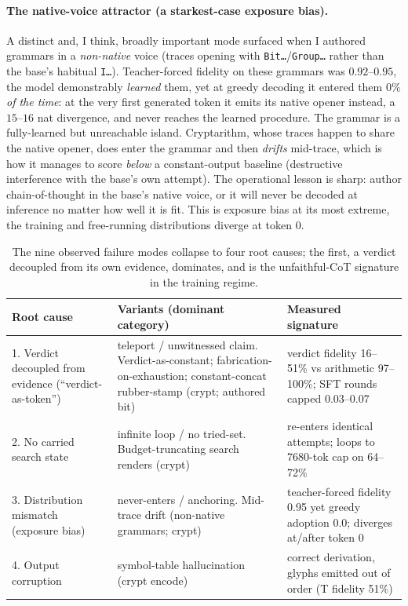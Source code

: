 \documentclass[11pt]{article}
\begin{document}
\paragraph{The native-voice attractor (a starkest-case exposure bias).} A distinct and, I
think, broadly important mode surfaced when I authored grammars in a \emph{non-native}
voice (traces opening with \texttt{Bit\dots}/\texttt{Group\dots} rather than the base's
habitual \texttt{I\dots}). Teacher-forced fidelity on these grammars was
$0.92$--$0.95$, the model demonstrably \emph{learned} them, yet at greedy decoding it
entered them \emph{$0\%$ of the time}: at the very first generated token it emits its native
opener instead, a $15$--$16$ nat divergence, and never reaches the learned procedure. The
grammar is a fully-learned but unreachable island. Cryptarithm, whose traces happen to share
the native opener, does enter the grammar and then \emph{drifts} mid-trace, which is how it
manages to score \emph{below} a constant-output baseline (destructive interference with the
base's own attempt). The operational lesson is sharp: author chain-of-thought in the base's
native voice, or it will never be decoded at inference no matter how well it is fit. This is
exposure bias \citep{bengio2015scheduled, ranzato2016sequence} at its most extreme, the
training and free-running distributions diverge at token $0$.

\begin{table}[htbp]
\centering
\caption{The nine observed failure modes collapse to four root causes; the first, a verdict
decoupled from its own evidence, dominates, and is the unfaithful-CoT signature
\citep{turpin2023unfaithful, lanham2023measuring} in the training regime.}
\label{tab:failuremodes}
\small
\begin{tabularx}{\linewidth}{@{}p{2.9cm} X X@{}}
\toprule
Root cause & Variants (dominant category) & Measured signature \\
\midrule
1. Verdict decoupled from evidence (``verdict-as-token'') & teleport / unwitnessed claim. Verdict-as-constant; fabrication-on-exhaustion; constant-concat rubber-stamp (crypt; authored bit) & verdict fidelity 16--51\% vs arithmetic 97--100\%; SFT rounds capped 0.03--0.07 \\
2. No carried search state & infinite loop / no tried-set. Budget-truncating search renders (crypt) & re-enters identical attempts; loops to 7680-tok cap on 64--72\% \\
3. Distribution mismatch (exposure bias) & never-enters / anchoring. Mid-trace drift (non-native grammars; crypt) & teacher-forced fidelity 0.95 yet greedy adoption 0.0; diverges at/after token 0 \\
4. Output corruption & symbol-table hallucination (crypt encode) & correct derivation, glyphs emitted out of order (T fidelity 51\%) \\
\bottomrule
\end{tabularx}
\end{table}
\end{document}
